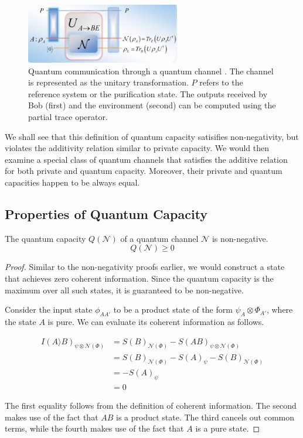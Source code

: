 \begin{figure}[H]
    \centering
    \includegraphics[width=0.6\textwidth]{figures/quantum_communication_quantum_channel.png}
    \caption{Quantum communication through a quantum channel \cite{Gyongyosi_2018}. The channel is represented as the unitary transformation. $P$ refers to the reference system or the purification state. The outputs received by Bob (first) and the environment (second) can be computed using the partial trace operator.}
\end{figure}

We shall see that this definition of quantum capacity satisifies non-negativity, but violates the additivity relation similar to private capacity. We would then examine a special class of quantum channels that satisfies the additive relation for both private and quantum capacity. Moreover, their private and quantum capacities happen to be always equal.

\subsection{Properties of Quantum Capacity}

\begin{theorem}
The quantum capacity $Q(\mathcal{N})$ of a quantum channel $\mathcal{N}$ is non-negative.
$$Q(\mathcal{N}) \geq 0$$
\end{theorem}

\begin{proof}
Similar to the non-negativity proofs earlier, we would construct a state that achieves zero coherent information. Since the quantum capacity is the maximum over all such states, it is guaranteed to be non-negative.

Consider the input state $\phi_{AA'}$ to be a product state of the form $\psi_A \otimes \Phi_{A'}$, where the state $A$ is pure. We can evaluate its coherent information as follows.

\begin{align*}
I(A \rangle B)_{\psi \otimes \mathcal{N}(\Phi)} &= S(B)_{\mathcal{N}(\Phi)} - S(AB)_{\psi \otimes \mathcal{N}(\Phi)} \\
&= S(B)_{\mathcal{N}(\Phi)} - S(A)_{\psi} - S(B)_{\mathcal{N}(\Phi)} \\
&= - S(A)_{\psi} \\
&= 0
\end{align*}

The first equality follows from the definition of coherent information. The second makes use of the fact that $AB$ is a product state. The third cancels out common terms, while the fourth makes use of the fact that $A$ is a pure state.
\end{proof}

